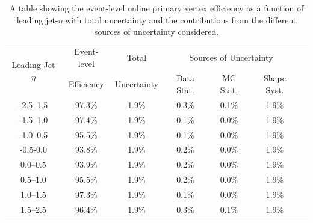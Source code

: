 \begin{table}[!ht]
  \begin{center}
  \begin{tabular}{|c||c|c||c|c|c||c|}
    \hline
\multirow{2}{*}{Leading Jet $\eta$} & Event-level  & Total       & \multicolumn{3}{c|}{Sources of Uncertainty} \\ \cline{4-6} 
                                    & Efficiency   & Uncertainty & Data Stat. & MC Stat. & Shape Syst. \\
\hline
-2.5--1.5 & 97.3\% & 1.9\% & 0.3\% & 0.1\% & 1.9\%  \\
-1.5--1.0 & 97.4\% & 1.9\% & 0.1\% & 0.0\% & 1.9\%  \\
-1.0--0.5 & 95.5\% & 1.9\% & 0.1\% & 0.0\% & 1.9\%  \\
-0.5-0.0  & 93.8\% & 1.9\% & 0.2\% & 0.0\% & 1.9\%  \\
0.0--0.5  & 93.9\% & 1.9\% & 0.2\% & 0.0\% & 1.9\%  \\
0.5--1.0  & 95.5\% & 1.9\% & 0.2\% & 0.0\% & 1.9\%  \\
1.0--1.5  & 97.3\% & 1.9\% & 0.1\% & 0.0\% & 1.9\%  \\
1.5--2.5  & 96.4\% & 1.9\% & 0.3\% & 0.1\% & 1.9\%  \\
\hline
\end{tabular}
  \caption{\label{tab:bTrig_eventEff} A table showing the event-level online primary vertex efficiency as a function of leading jet-$\eta$
    with total uncertainty and the contributions from the different sources of uncertainty considered.}    
  \end{center}
\end{table}

\vfill

